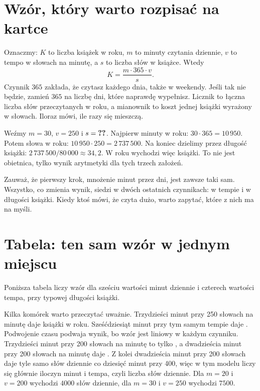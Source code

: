 \section{Wzór, który warto rozpisać na kartce}

Oznaczmy: $K$ to liczba książek w roku, $m$ to minuty czytania dziennie, $v$ to tempo w słowach na minutę, a $s$ to liczba słów w książce. Wtedy
\[ K = \frac{m \cdot 365 \cdot v}{s}. \]
Czynnik $365$ zakłada, że czytasz każdego dnia, także w weekendy. Jeśli tak nie będzie, zamień $365$ na liczbę dni, które naprawdę wypełnisz. Licznik to łączna liczba słów przeczytanych w roku, a mianownik to koszt jednej książki wyrażony w słowach. Iloraz mówi, ile razy się mieszczą.

\begin{przyklad}
Weźmy $m = 30$, $v = 250$ i $s = \val{typical.words}$. Najpierw minuty w roku: $30 \cdot 365 = 10\,950$. Potem słowa w roku: $10\,950 \cdot 250 = 2\,737\,500$. Na koniec dzielimy przez długość książki: $2\,737\,500 / 80\,000 \approx 34{,}2$. W roku wychodzi więc  książki. To nie jest obietnica, tylko wynik arytmetyki dla tych trzech założeń.
\end{przyklad}

Zauważ, że pierwszy krok, mnożenie minut przez dni, jest zawsze taki sam. Wszystko, co zmienia wynik, siedzi w dwóch ostatnich czynnikach: w tempie i w długości książki. Kiedy ktoś mówi, że \glqq czyta dużo\grqq{}, warto zapytać, które z nich ma na myśli.

\section{Tabela: ten sam wzór w jednym miejscu}

Poniższa tabela liczy wzór dla sześciu wartości minut dziennie i czterech wartości tempa, przy typowej długości książki.


Kilka komórek warto przeczytać uważnie. Trzydzieści minut przy 250 słowach na minutę daje  książki w roku. Sześćdziesiąt minut przy tym samym tempie daje . Podwojenie czasu podwaja wynik, bo wzór jest liniowy w każdym czynniku. Trzydzieści minut przy 200 słowach na minutę to tylko , a dwadzieścia minut przy 200 słowach na minutę daje . Z kolei dwadzieścia minut przy 200 słowach daje tyle samo słów dziennie co dziesięć minut przy 400, więc w tym modelu liczy się głównie iloczyn minut i tempa, czyli liczba słów dziennie. Dla $m = 20$ i $v = 200$ wychodzi $4000$ słów dziennie, dla $m = 30$ i $v = 250$ wychodzi $7500$.

